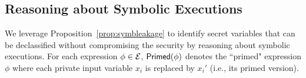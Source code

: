 %
%
%
%
%
%
%


\subsection{Reasoning about Symbolic Executions}
We leverage Proposition~\ref{prop:symbleakage} to identify secret variables
that can be declassified  without compromising the security by reasoning about symbolic executions. %
%
For each expression $\phi\in \mathcal{E}$,
${\sf Primed}(\phi)$ denotes the ``primed" expression $\phi$ where each  private input variable $x_i$
is replaced by $x_i'$ (i.e.,  its primed version).

